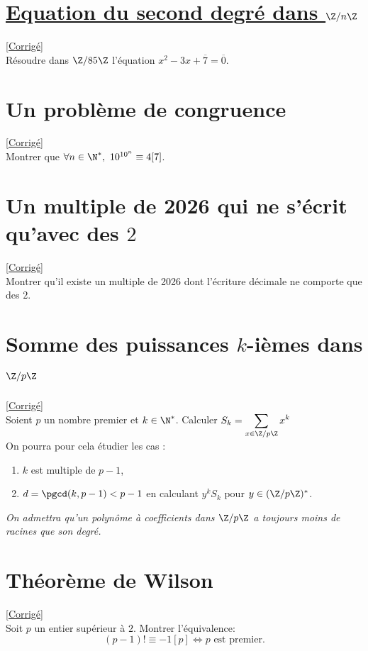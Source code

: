 \documentclass[8pt]{book}
\begin{document}
\section{\underline{Equation du second degré dans $\Z/n\Z$} }
\label{Equation du second degré dans Z/nZ}
\textcolor{blue}{\hyperref[Equation du second degré dans Z/nZ corrigé]{[Corrigé]}}\\
Résoudre dans $\Z/85\Z$ l'équation $x^2-3x+\overline{7}=\overline{0}$.

\section{Un problème de congruence }
\label{Un problème de congruence}
\textcolor{blue}{\hyperref[Un problème de congruence corrigé]{[Corrigé]}}\\
Montrer que $\forall n\in \N^*,\ 10^{10^n}\equiv 4[7]$.

\section{Un multiple de 2026 qui ne s'écrit qu'avec des $2$ }
\label{Un multiple de 2026}
\textcolor{blue}{\hyperref[Un multiple de 2026 corrigé]{[Corrigé]}}\\
Montrer qu'il existe un multiple de 2026 dont l'écriture décimale ne comporte que des $2$.

\section{Somme des puissances $k$-ièmes dans $\Z/p\Z$ }
\label{Somme des puissances k iemes dans Z/pZ}
\textcolor{blue}{\hyperref[Somme des puissances k iemes dans Z/pZ corrigé]{[Corrigé]}}\\
Soient $p$ un nombre premier et $k\in \N^*$. Calculer $S_k=\displaystyle\sum\limits_{x\in \Z/p\Z}{x^k}$\\
On pourra pour cela étudier les cas :
\begin{enumerate}[label=(\roman*)]
	\item $k$ est multiple de $p-1$,
	\item $d=\pgcd(k,p-1)<p-1$ en calculant $y^kS_k$ pour $y\in (\Z/p\Z)^*$.
\end{enumerate}
\textit{On admettra qu'un polynôme à coefficients dans $\Z/p\Z$ a toujours moins de racines que son degré.}

\section{Théorème de Wilson }
\label{Théorème de Wilson}
\textcolor{blue}{\hyperref[Théorème de Wilson corrigé]{[Corrigé]}}\\
Soit $p$ un entier supérieur à $2$. Montrer l'équivalence:
$$(p-1)!\equiv -1[p] \Longleftrightarrow p \text{ est premier.}$$
\end{document}
